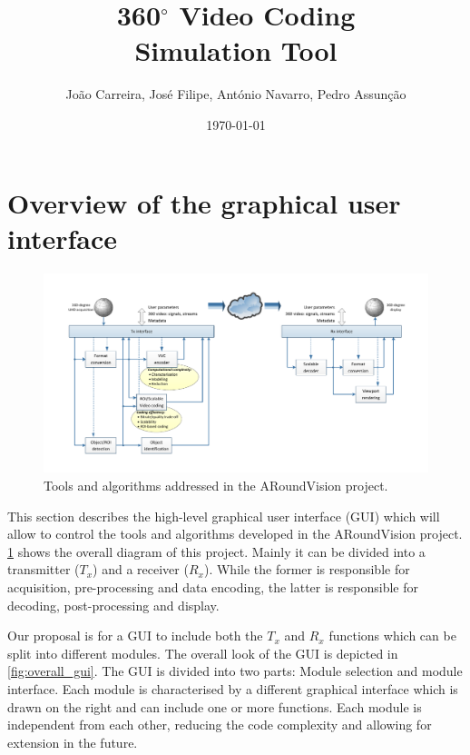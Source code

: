 \documentclass{article}
\title{\textbf{360$^\circ$ Video Coding}\\ \textbf{Simulation Tool}}
\author{João Carreira, José Filipe, António Navarro, Pedro Assunção}
\date{\today}
\begin{document}
\maketitle
\tableofcontents

\section{Overview of the graphical user interface}

\begin{figure}[ht]
    \centering
    \includegraphics[width=1\textwidth]{ARoundVision_Framework_Diagram_v2.pdf}
    \caption{Tools and algorithms addressed in the ARoundVision project.}
    \label{fig:scheme}
\end{figure}

This section describes the high-level graphical user interface (GUI) which will allow to control the tools and algorithms developed in the ARoundVision project. \cref{fig:scheme} shows the overall diagram of this project. Mainly it can be divided into a transmitter ($T_x$) and a receiver ($R_x$). While the former is responsible for acquisition, pre-processing and data encoding, the latter is responsible for decoding, post-processing and display. 

Our proposal is for a GUI to include both the $T_x$ and $R_x$ functions which can be split into different modules. The overall look of the GUI is depicted in \cref{fig:overall_gui}. The GUI is divided into two parts: Module selection and module interface. Each module is characterised by a different graphical interface which is drawn on the right and can include one or more functions. Each module is independent from each other, reducing the code complexity and allowing for extension in the future. 
\end{document}
